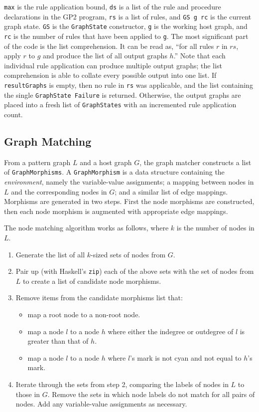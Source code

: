 \texttt{max} is the rule application bound, \texttt{ds} is a list of the rule and procedure declarations in the GP2 program, \texttt{rs} is a list of rules, and \texttt{GS g rc} is the current graph state. \texttt{GS} is the \texttt{GraphState} constructor, \texttt{g} is the working host graph, and \texttt{rc} is the number of rules that have been applied to \texttt{g}. The most significant part of the code is the list comprehension. It can be read as, ``for all rules $r$ in $rs$, apply $r$ to $g$ and produce the list of all output graphs $h$.'' Note that each individual rule application can produce multiple output graphs; the list comprehension is able to collate every possible output into one list. If \texttt{resultGraphs} is empty, then no rule in \texttt{rs} was applicable, and the list containing the single \texttt{GraphState Failure} is returned. Otherwise, the output graphs are placed into a fresh list of \texttt{GraphStates} with an incremented rule application count.


\subsection{Graph Matching}

From a pattern graph $L$ and a host graph $G$, the graph matcher constructs a list of \texttt{GraphMorphisms}. A \texttt{GraphMorphism} is a data structure containing the \textit{environment}, namely the variable-value assignments; a mapping between nodes in $L$ and the corresponding nodes in $G$; and a similar list of edge mappings. Morphisms are generated in two steps. First the node morphisms are constructed, then each node morphism is augmented with appropriate edge mappings. 

The node matching algorithm works as follows, where $k$ is the number of nodes in $L$. 

\begin{enumerate}
\item Generate the list of all $k$-sized sets of nodes from $G$.
\item Pair up (with Haskell's \texttt{zip}) each of the above sets with the set of nodes from $L$ to create a list of candidate node morphisms.
\item Remove items from the candidate morphisms list that:
  \begin{itemize}
  \item map a root node to a non-root node.
  \item map a node $l$ to a node $h$ where either the indegree or outdegree of $l$ is greater than that of $h$.
  \item map a node $l$ to a node $h$ where $l$'s mark is not cyan and not equal to $h$'s mark.
  \end{itemize}
\item Iterate through the sets from step 2, comparing the labels of nodes in $L$ to those in $G$. Remove the sets in which node labels do not match for all pairs of nodes. Add any variable-value assignments as necessary.
\end{enumerate}

